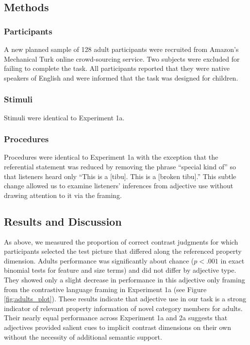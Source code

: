 \documentclass[10pt,letterpaper]{article}
\begin{document}
\subsection{Methods}

\subsubsection{Participants}

A new planned sample of 128 adult participants were recruited from Amazon's Mechanical Turk online crowd-sourcing service.  Two subjects were excluded for failing to complete the task. All participants reported that they were native speakers of English and were informed that the task was designed for children.  

\subsubsection{Stimuli}

Stimuli were identical to Experiment 1a. 

\subsubsection{Procedures}

Procedures were identical to Experiment 1a with the exception that the referential statement was reduced by removing the phrase ``special kind of'' so that listeners heard only ``This is a [tibu]. This is a [broken tibu].''   This subtle change allowed us to examine listeners' inferences from adjective use without drawing attention to it via the framing.  

\subsection{Results and Discussion}

As above, we measured the proportion of correct contrast judgments for which participants selected the test picture that differed along the referenced property dimension.  Adults performance was significantly about chance ($p < .001$ in exact binomial tests for feature and size terms) and did not differ by adjective type.  They showed only a slight decrease in performance in this adjective only framing from the contrastive language framing in Experiment 1a (see Figure \ref{fig:adults_plot}).  These results indicate that adjective use in our task is a strong indicator of relevant property information of novel category members for adults.  Their nearly equal performance across Experiment 1a and 2a suggests that adjectives provided salient cues to implicit contrast dimensions on their own without the necessity of additional semantic support. 
\end{document}
